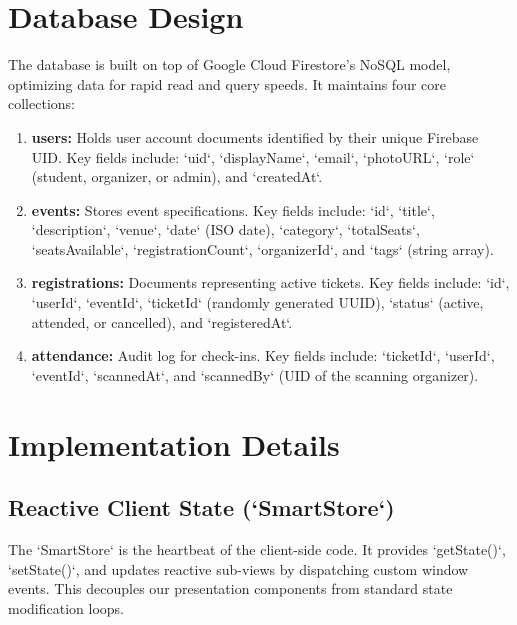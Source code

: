 \documentclass[14pt,a4paper]{extreport}
\begin{document}
\clearpage

\section{Database Design}
The database is built on top of Google Cloud Firestore's NoSQL model, optimizing data for rapid read and query speeds. It maintains four core collections:
\begin{enumerate}
    \item \textbf{users:} Holds user account documents identified by their unique Firebase UID. Key fields include: `uid`, `displayName`, `email`, `photoURL`, `role` (student, organizer, or admin), and `createdAt`.
    \item \textbf{events:} Stores event specifications. Key fields include: `id`, `title`, `description`, `venue`, `date` (ISO date), `category`, `totalSeats`, `seatsAvailable`, `registrationCount`, `organizerId`, and `tags` (string array).
    \item \textbf{registrations:} Documents representing active tickets. Key fields include: `id`, `userId`, `eventId`, `ticketId` (randomly generated UUID), `status` (active, attended, or cancelled), and `registeredAt`.
    \item \textbf{attendance:} Audit log for check-ins. Key fields include: `ticketId`, `userId`, `eventId`, `scannedAt`, and `scannedBy` (UID of the scanning organizer).
\end{enumerate}

\section{Implementation Details}
\subsection{Reactive Client State (`SmartStore`)}
The `SmartStore` is the heartbeat of the client-side code. It provides `getState()`, `setState()`, and updates reactive sub-views by dispatching custom window events. This decouples our presentation components from standard state modification loops.
\end{document}
